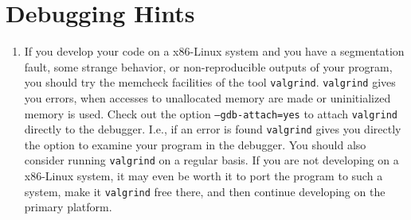 \documentclass[12pt]{article}
\begin{document}
\section{Debugging Hints}
\begin{enumerate}
\item If you develop your code on a x86-Linux system and you have a segmentation fault, some strange behavior, or non-reproducible outputs of your program,
you should try the memcheck facilities of the tool \texttt{valgrind}.
\texttt{valgrind} gives you errors, when accesses to unallocated memory are made or uninitialized memory is used. Check out the option \texttt{--gdb-attach=yes} to attach \texttt{valgrind} directly to the debugger. I.e., if an error is found \texttt{valgrind} gives you directly the option to examine your program in the debugger. 
You should also consider running \texttt{valgrind} on a regular basis.
If you are not developing on a x86-Linux system, it may even be worth it to port the program to such a system, make it \texttt{valgrind} free there, and then continue developing on the primary platform.
\end{enumerate}
\end{document}
